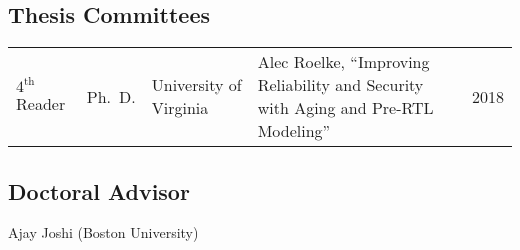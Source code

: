 \documentclass{article}
\begin{document}
\subsection*{Thesis Committees}
\renewcommand\entry[5]{#1 & #2 & #3 & #4 & #5}
\begin{longtabu} to \textwidth {lllXr}
  \entry{$4^\textrm{th}$ Reader}{Ph.~D.}{University of Virginia}{Alec Roelke, ``Improving Reliability and Security with Aging and Pre-RTL Modeling''}{2018}
\end{longtabu}

\subsection*{Doctoral Advisor}
Ajay Joshi (Boston University)
\end{document}
